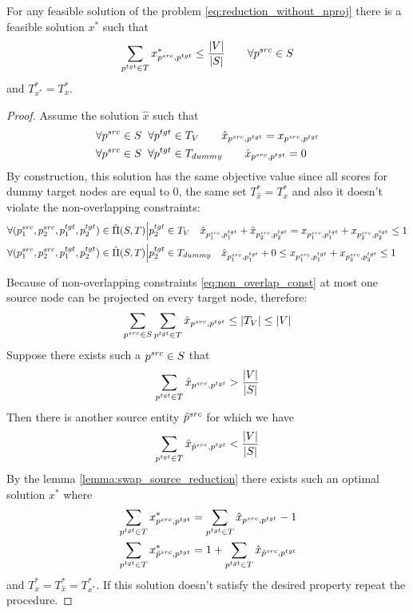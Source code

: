 \begin{corollary} \label{col:bound_num_proj_reduction}
  For any feasible solution of the problem \eqref{eq:reduction_without_nproj} there is a feasible solution  \( x^* \)
  such that
  \[
    \sum\limits_{p^{tgt} \in T} x^*_{p^{src}, p^{tgt}} \leq \frac{|V|}{|S|}
    \qquad \forall p^{src} \in S
  \]
  and \( T_{x^*}^* =  T^*_x \).
\end{corollary}
\begin{proof}
  Assume the solution \( \hat{x} \) such that
  \begin{align*}
    & \forall p^{src} \in S \;\; \forall p^{tgt} \in T_V \qquad \hat{x}_{p^{src}, p^{tgt}} = x_{p^{src}, p^{tgt}} \\
    & \forall p^{src} \in S \;\; \forall p^{tgt} \in T_{dummy} \qquad \hat{x}_{p^{src}, p^{tgt}} = 0
  \end{align*}
  By construction, this solution has the same objective value since all scores for dummy target nodes are equal to \( 0 \),
  the same set \( T^*_{\hat{x}} = T^*_x \)
  and also it doesn't violate the non-overlapping constraints:
  \begin{align*}
    & \forall (p_1^{src}, p_2^{src}, p_1^{tgt}, p_2^{tgt}) \in \hat{\Pi}(S, T) \Big| p_2^{tgt} \in T_{V} \quad
    \hat{x}_{p_1^{src}, p_1^{tgt}} + \hat{x}_{p_2^{src}, p_2^{tgt}} =
    x_{p_1^{src}, p_1^{tgt}} + x_{p_2^{src}, p_2^{tgt}} \leq 1                                                      \\
    & \forall (p_1^{src}, p_2^{src}, p_1^{tgt}, p_2^{tgt}) \in \hat{\Pi}(S, T) \Big| p_2^{tgt} \in T_{dummy} \quad
    \hat{x}_{p_1^{src}, p_1^{tgt}} + 0 \leq
    x_{p_1^{src}, p_1^{tgt}} + x_{p_2^{src}, p_2^{tgt}} \leq 1
  \end{align*}

  Because of non-overlapping constraints \eqref{eq:non_overlap_const} at most one source node can
  be projected on every target node, therefore:
  \[
    \sum\limits_{p^{src} \in S} \sum\limits_{p^{tgt} \in T} \hat{x}_{p^{src}, p^{tgt}} \leq |T_V| \leq |V|
  \]
  Suppose there exists such a \( p^{src} \in S \) that
  \[
    \sum\limits_{p^{tgt} \in T} \hat{x}_{p^{src}, p^{tgt}} > \frac{|V|}{|S|}
  \]
  Then there is another source entity \( \hat{p}^{src} \) for which we have
  \[
    \sum\limits_{p^{tgt} \in T} \hat{x}_{\hat{p}^{src}, p^{tgt}} < \frac{|V|}{|S|}
  \]
  By the lemma \ref{lemma:swap_source_reduction} there exists such an optimal solution \( x^* \)
  where
  \begin{align*}
    & \sum\limits_{p^{tgt} \in T} x^*_{p^{src}, p^{tgt}} = \sum\limits_{p^{tgt} \in T} \hat{x}_{p^{src}, p^{tgt}} - 1             \\
    & \sum\limits_{p^{tgt} \in T} x^*_{\hat{p}^{src}, p^{tgt}} = 1 + \sum\limits_{p^{tgt} \in T} \hat{x}_{\hat{p}^{src}, p^{tgt}} \\
  \end{align*}
  and \( T^*_x = T^*_{\hat{x}} = T^*_{x^*}  \). If this solution doesn't satisfy the desired property repeat the procedure.
\end{proof}

